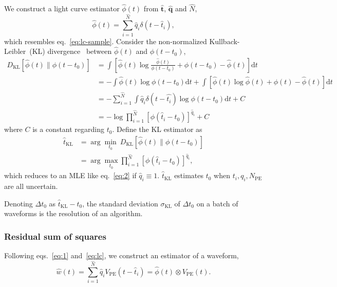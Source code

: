 We construct a light curve estimator $\hat{\phi}(t)$ from $\bm{\hat{t}}$, $\bm{\hat{q}}$ and $\hat{N}$,
\begin{equation}
  \label{eq:lc}
  \hat{\phi}(t) = \sum_{i=1}^{\hat{N}} \hat{q}_i\delta(t-\hat{t}_i),
\end{equation}
which resembles eq.~\eqref{eq:lc-sample}.
Consider the non-normalized Kullback-Leibler~(KL) divergence~\cite{mihoko_robust_2002} between $\hat{\phi}(t)$ and $\phi(t-t_{0})$,
\begin{equation}
  \begin{aligned}
    D_\mathrm{KL}\left[\hat{\phi}(t) \parallel \phi(t-t_0)\right] & =\int \left[\hat{\phi}(t) \log\frac{\hat{\phi}(t)}{\phi(t-t_0)} + \phi(t-t_0) - \hat{\phi}(t) \right]\mathrm{d}t \\
    & = - \int \hat{\phi}(t) \log\phi(t-t_0)\mathrm{d}t + \int \left[\hat{\phi}(t) \log\hat{\phi}(t) + \phi(t) - \hat{\phi}(t) \right]\mathrm{d}t \\
    & = - \sum_{i=1}^{\hat{N}}\int \hat{q}_i\delta(t-\hat{t_i}) \log\phi(t-t_0)\mathrm{d}t + C \\
    & = -\log \prod_{i=1}^{\hat{N}} \left[\phi(\hat{t}_i-t_0)\right]^{\hat{q}_i} + C
  \label{eq:kl}
  \end{aligned}
\end{equation}
where $C$ is a constant regarding $t_0$.  Define the KL estimator as
\begin{equation}
  \begin{aligned}
  \label{eq:pseudo}
  \hat{t}_\mathrm{KL} &= \arg\underset{t_0}{\min}~D_\mathrm{KL}\left[\hat{\phi}(t) \parallel \phi(t-t_0)\right] \\
  &= \arg\underset{t_0}{\max} \prod_{i=1}^{\hat{N}} \left[\phi(\hat{t}_i-t_0)\right]^{\hat{q}_i},
  \end{aligned}
\end{equation}
which reduces to an MLE like eq.~\eqref{eq:2} if $\hat{q}_i\equiv 1$.  $\hat{t}_\mathrm{KL}$ estimates $t_0$ when $t_i, q_i, N_\mathrm{PE}$ are all uncertain.

Denoting $\Delta t_0$ as $\hat{t}_\mathrm{KL} - t_0$, the standard deviation $\sigma_\mathrm{KL}$ of $\Delta t_0$ on a batch of waveforms is the resolution of an algorithm.

\subsubsection{Residual sum of squares}
\label{sec:rss}

Following eqs.~\eqref{eq:1} and~\eqref{eq:lc}, we construct an estimator of a waveform,
\begin{equation}
  \label{eq:w-hat}
  \hat{w}(t) = \sum_{i=1}^{\hat{N}}\hat{q}_i V_\mathrm{PE}(t-\hat{t}_i) = \hat{\phi}(t) \otimes V_\mathrm{PE}(t).
\end{equation}

